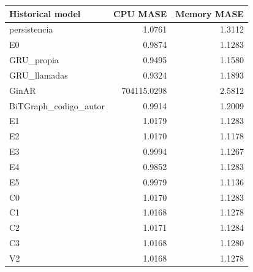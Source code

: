 \begin{tabular}{lrr}
\toprule
Historical model & CPU MASE & Memory MASE \\
\midrule
persistencia & 1.0761 & 1.3112 \\
E0 & 0.9874 & 1.1283 \\
GRU\_propia & 0.9495 & 1.1580 \\
GRU\_llamadas & 0.9324 & 1.1893 \\
GinAR & 704115.0298 & 2.5812 \\
BiTGraph\_codigo\_autor & 0.9914 & 1.2009 \\
E1 & 1.0179 & 1.1283 \\
E2 & 1.0170 & 1.1178 \\
E3 & 0.9994 & 1.1267 \\
E4 & 0.9852 & 1.1283 \\
E5 & 0.9979 & 1.1136 \\
C0 & 1.0170 & 1.1283 \\
C1 & 1.0168 & 1.1278 \\
C2 & 1.0171 & 1.1284 \\
C3 & 1.0168 & 1.1280 \\
V2 & 1.0168 & 1.1278 \\
\bottomrule
\end{tabular}
